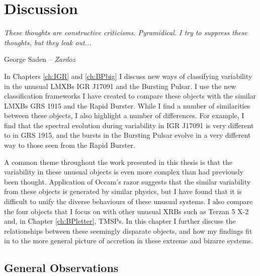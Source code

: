 \chapter{Discussion}

\label{ch:conc}

\epigraph{\textit{These thoughts are constructive criticisms. Pyramidical. I try to suppress these thoughts, but they leak out...}}{George Saden -- \textit{Zardoz}}

\vspace{1cm}

\par\noindent In Chapters \ref{ch:IGR} and \ref{ch:BPbig} I discuss new ways of classifying variability in the unusual LMXBs IGR J17091 and the Bursting Pulsar.  I use the new classification frameworks I have created to compare these objects with the similar LMXBs GRS 1915 and the Rapid Burster.  While I find a number of similarities between these objects, I also highlight a number of differences.  For example, I find that the spectral evolution during variability in IGR J17091 is very different to in GRS 1915, and the bursts in the Bursting Pulsar evolve in a very different way to those seen from the Rapid Burster.
\par A common theme throughout the work presented in this thesis is that the variability in these unusual objects is even more complex than had previously been thought.  Application of Occam's razor \citep{Occam} suggests that the similar variability from these objects is generated by similar physics, but I have found that it is difficult to unify the diverse behaviours of these unusual systems.  I also compare the four objects that I focus on with other unusual XRBs such as Terzan 5 X-2 and, in Chapter \ref{ch:BPletter}, TMSPs.  In this chapter I further discuss the relationships between these seemingly disparate objects, and how my findings fit in to the more general picture of accretion in these extreme and bizarre systems.

\section{General Observations}

\label{sec:disccomp}

